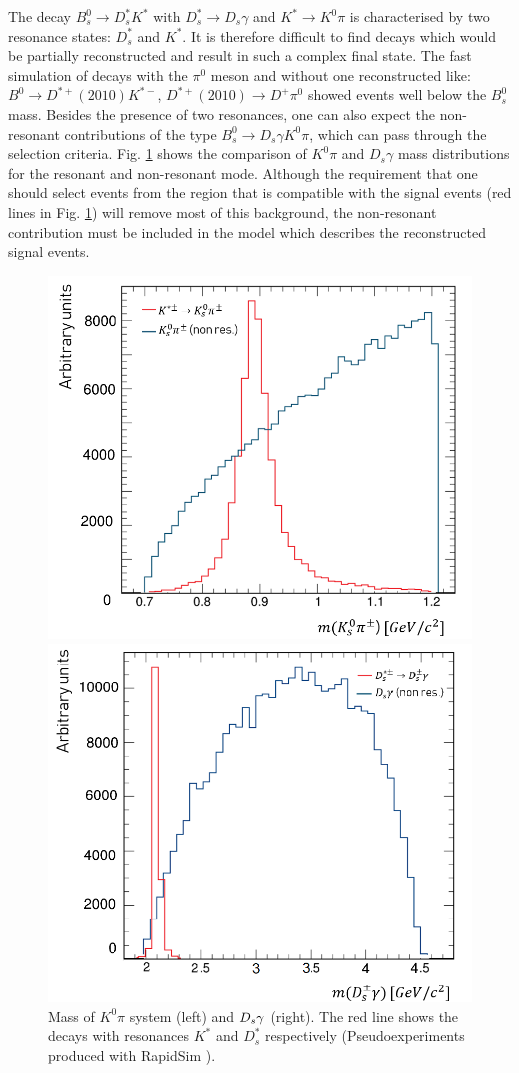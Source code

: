 \documentclass{appolb}
\begin{document}
The decay $B^0_s \rightarrow D_s^* K^*$ with $D_s^*\rightarrow D_s \gamma$ and $K^*\rightarrow K^0 \pi$ is characterised by two resonance states: $D_s^*$ and $K^*$. It is therefore difficult to find  decays which would be partially reconstructed and result in such a complex final state. The fast simulation of decays with the $\pi^0$ meson and without one \g reconstructed like: $B^0 \rightarrow D^{*+}(2010) K^{*-}$, $D^{*+}(2010)\rightarrow D^+ \pi^0$ showed events well below the $B^0_s$ mass. Besides the presence of two resonances, one can also expect the non-resonant contributions of the type $B^0_s \rightarrow D_s \gamma  K^0 \pi$,  which can pass through the selection criteria.  Fig. \ref{Fig:F2} shows the comparison of  $K^0 \pi$ and $D_s \gamma$ mass distributions for the resonant and non-resonant mode. Although the requirement that one should select events from the region that is compatible with the signal events (red lines in Fig. \ref{Fig:F2}) will remove most of this background, the non-resonant contribution must be included in the model which describes the reconstructed signal events.
\begin{figure}[htbp]
\centering
\begin{minipage}{0.5\textwidth}
  \centering
\includegraphics[width=6.4 cm]{Kstar.png}
\end{minipage}%
\begin{minipage}{0.5\textwidth}
  \centering
\includegraphics[width= 6.4 cm]{Dstar.png}
\end{minipage}%
\caption{Mass  of $K^0 \pi$ system (left) and $D_s {\gamma}$ (right).
The red line shows the decays with resonances $K^*$ and $D_s^*$ respectively (Pseudoexperiments produced with RapidSim \cite{rapidsim}).} 
\label{Fig:F2}
\end{figure}
\end{document}
